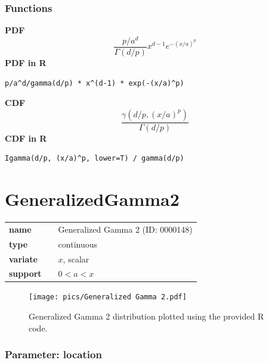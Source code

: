 \documentclass{article}
\begin{document}
\subsubsection*{Functions}

\smallskip \noindent \hspace{.2cm} \textbf{PDF} 
\begin{equation*}\frac{p/a^d}{\Gamma(d/p)} x^{d-1}e^{-(x/a)^p}\end{equation*}
\smallskip \noindent \hspace{.2cm} \textbf{PDF in R}  
\begin{verbatim}p/a^d/gamma(d/p) * x^(d-1) * exp(-(x/a)^p)\end{verbatim}
\smallskip \noindent \hspace{.2cm} \textbf{CDF} 
\begin{equation*}\frac{\gamma(d/p, (x/a)^p)}{\Gamma(d/p)}\end{equation*}
\smallskip \noindent \hspace{.2cm} \textbf{CDF in R} 
\begin{verbatim}Igamma(d/p, (x/a)^p, lower=T) / gamma(d/p)\end{verbatim}
\smallskip\section*{GeneralizedGamma2} 

  \bigskip 

\begin{tabular}{p{2cm}cl}
\textbf{name} & & Generalized Gamma 2 (ID: 0000148)\\ 
 
\textbf{type} & & continuous \\ 

\textbf{variate} & & $x$, scalar \\ 

\textbf{support} & & $0 < a < x$
\end{tabular}

\begin{figure}[ht!]
\centering
  \texttt{[image: pics/Generalized Gamma 2.pdf]}
 \caption{Generalized Gamma 2 distribution plotted using the provided R code.}
 \label{fig:Generalized Gamma 2}
\end{figure}

\subsubsection*{Parameter: location}
\end{document}

